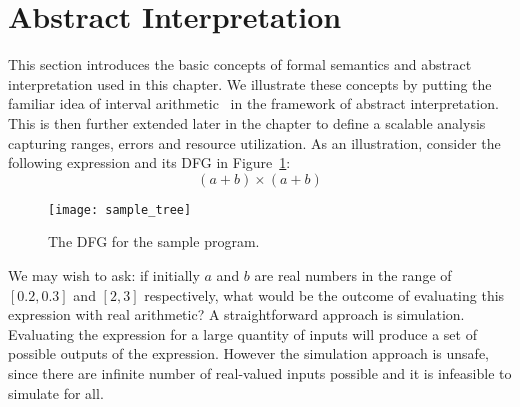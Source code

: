 \section{Abstract Interpretation}
\label{sec:abstract_interpretation}

This section introduces the basic concepts of formal semantics and abstract
interpretation used in this chapter. We illustrate these concepts by putting
the familiar idea of interval arithmetic~\cite{moore} in the framework
of abstract interpretation. This is then further extended later in the
chapter to define a scalable analysis capturing ranges, errors and resource
utilization. As an illustration, consider the following expression and its DFG
in Figure~\ref{fig:sample_tree}\@:
\begin{equation}
    (a + b) \times (a + b)
    \label{eq:absint_sample}
\end{equation}
\begin{figure}[ht]
    \centering
    \texttt{[image: sample\_tree]}
    \caption{The DFG for the sample program.}\label{fig:sample_tree}
\end{figure}

We may wish to ask: if initially $a$ and $b$ are real numbers in the range of
$[0.2, 0.3]$ and $[2, 3]$ respectively, what would be the outcome of evaluating
this expression with real arithmetic? A straightforward approach is simulation.
Evaluating the expression for a large quantity of inputs will produce a set
of possible outputs of the expression. However the simulation approach is
unsafe, since there are infinite number of real-valued inputs possible and it
is infeasible to simulate for all.

